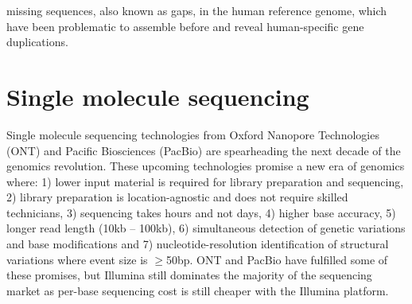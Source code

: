 missing sequences, also known as gaps, in the human reference genome, which have been problematic to assemble before and reveal human-specific gene duplications.   
%
%








\section{Single molecule sequencing}

Single molecule sequencing technologies from Oxford Nanopore Technologies (ONT) and Pacific Biosciences (PacBio) are spearheading the next decade of the genomics revolution. These upcoming technologies promise a new era of genomics where: 1) lower input material is required for library preparation and sequencing, 2) library preparation is location-agnostic and does not require skilled technicians, 3) sequencing takes hours and not days, 4) higher base accuracy, 5) longer read length (10kb – 100kb), 6) simultaneous detection of genetic variations and base modifications and 7) nucleotide-resolution identification of structural variations where event size is $\geq$50bp. ONT and PacBio have fulfilled some of these promises, but Illumina still dominates the majority of the sequencing market as per-base sequencing cost is still cheaper with the Illumina platform.

